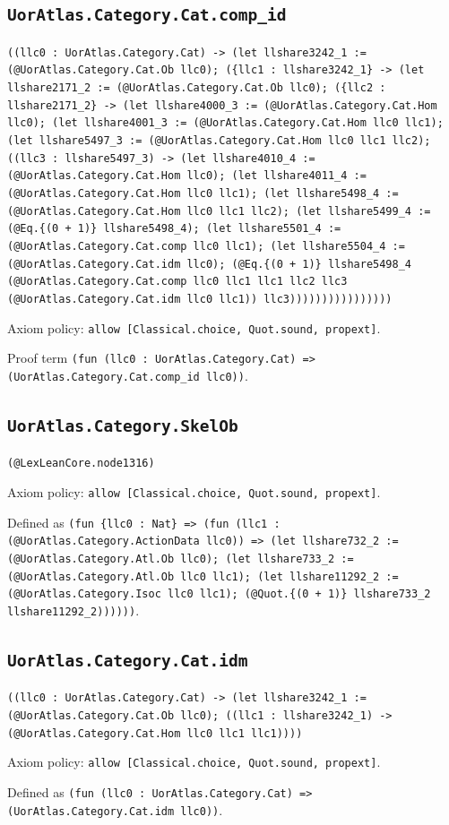 \documentclass[11pt]{article}
\begin{document}
\subsection*{\texttt{UorAtlas.Category.Cat.comp\_id}}
\noindent\texttt{((llc0 : UorAtlas.Category.Cat) -> (let llshare3242\_1 := (@UorAtlas.Category.Cat.Ob llc0); (\{llc1 : llshare3242\_1\} -> (let llshare2171\_2 := (@UorAtlas.Category.Cat.Ob llc0); (\{llc2 : llshare2171\_2\} -> (let llshare4000\_3 := (@UorAtlas.Category.Cat.Hom llc0); (let llshare4001\_3 := (@UorAtlas.Category.Cat.Hom llc0 llc1); (let llshare5497\_3 := (@UorAtlas.Category.Cat.Hom llc0 llc1 llc2); ((llc3 : llshare5497\_3) -> (let llshare4010\_4 := (@UorAtlas.Category.Cat.Hom llc0); (let llshare4011\_4 := (@UorAtlas.Category.Cat.Hom llc0 llc1); (let llshare5498\_4 := (@UorAtlas.Category.Cat.Hom llc0 llc1 llc2); (let llshare5499\_4 := (@Eq.\{(0 + 1)\} llshare5498\_4); (let llshare5501\_4 := (@UorAtlas.Category.Cat.comp llc0 llc1); (let llshare5504\_4 := (@UorAtlas.Category.Cat.idm llc0); (@Eq.\{(0 + 1)\} llshare5498\_4 (@UorAtlas.Category.Cat.comp llc0 llc1 llc1 llc2 llc3 (@UorAtlas.Category.Cat.idm llc0 llc1)) llc3))))))))))))))))}\par
\noindent Axiom policy: \texttt{allow [Classical.choice, Quot.sound, propext]}.\par
\noindent Proof term \texttt{(fun (llc0 : UorAtlas.Category.Cat) => (UorAtlas.Category.Cat.comp\_id llc0))}.\par
\subsection*{\texttt{UorAtlas.Category.SkelOb}}
\noindent\texttt{(@LexLeanCore.node1316)}\par
\noindent Axiom policy: \texttt{allow [Classical.choice, Quot.sound, propext]}.\par
\noindent Defined as \texttt{(fun \{llc0 : Nat\} => (fun (llc1 : (@UorAtlas.Category.ActionData llc0)) => (let llshare732\_2 := (@UorAtlas.Category.Atl.Ob llc0); (let llshare733\_2 := (@UorAtlas.Category.Atl.Ob llc0 llc1); (let llshare11292\_2 := (@UorAtlas.Category.Isoc llc0 llc1); (@Quot.\{(0 + 1)\} llshare733\_2 llshare11292\_2))))))}.\par
\subsection*{\texttt{UorAtlas.Category.Cat.idm}}
\noindent\texttt{((llc0 : UorAtlas.Category.Cat) -> (let llshare3242\_1 := (@UorAtlas.Category.Cat.Ob llc0); ((llc1 : llshare3242\_1) -> (@UorAtlas.Category.Cat.Hom llc0 llc1 llc1))))}\par
\noindent Axiom policy: \texttt{allow [Classical.choice, Quot.sound, propext]}.\par
\noindent Defined as \texttt{(fun (llc0 : UorAtlas.Category.Cat) => (UorAtlas.Category.Cat.idm llc0))}.\par
\end{document}

